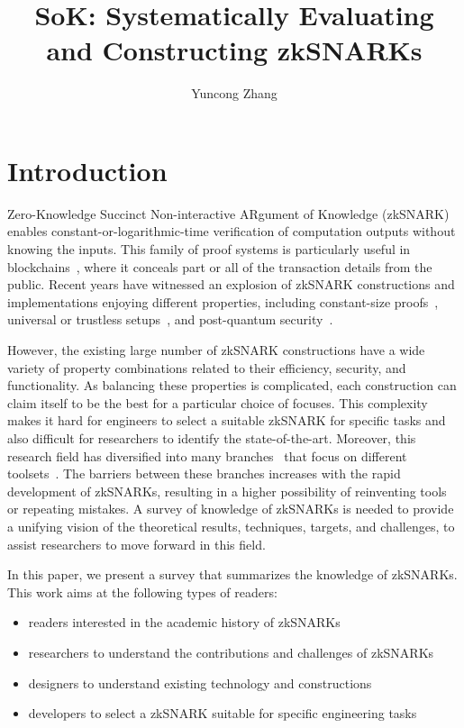 \documentclass[acmtog]{acmart}
\title{SoK: Systematically Evaluating and Constructing zkSNARKs}
\author{Yuncong Zhang}
\begin{document}
\begin{abstract}
\end{abstract}

\maketitle

\section{Introduction}

Zero-Knowledge Succinct Non-interactive ARgument of Knowledge (zkSNARK)~\cite{BitanskyCCT12} enables constant-or-logarithmic-time verification of computation outputs without knowing the inputs.
This family of proof systems is particularly useful in blockchains~\cite{Ben-SassonCG0MTV14, SunALY17}, where it conceals part or all of the transaction details from the public.
Recent years have witnessed an explosion of zkSNARK constructions and implementations enjoying different properties, including constant-size proofs~\cite{Groth16, GennaroGP013, Ben-SassonCGTV13, ParnoHG013, Ben-SassonCTV13}, universal or trustless setups~\cite{GrothKMMM18, MallerBKM19, BunzFS20, Ben-SassonBHR18, Ben-SassonCRSVW19, AmesHIV17}, and post-quantum security~\cite{Ben-SassonBHR18, Ben-SassonCRSVW19}.

However, the existing large number of zkSNARK constructions have a wide variety of property combinations related to their efficiency, security, and functionality.
As balancing these properties is complicated, each construction can claim itself to be the best for a particular choice of focuses.
This complexity makes it hard for engineers to select a suitable zkSNARK for specific tasks and also difficult for researchers to identify the state-of-the-art.
Moreover, this research field has diversified into many branches~\cite{XieZZPS19, Nitulescu19, WalfishB15, AmesHIV17, MallerBKM19} that focus on different toolsets~\cite{KateZG10, BabaiFLS91, BonehF01, FiatS86, GennaroGP013, BunzFS20}.
The barriers between these branches increases with the rapid development of zkSNARKs, resulting in a higher possibility of reinventing tools or repeating mistakes.
A survey of knowledge of zkSNARKs is needed to provide a unifying vision of the theoretical results, techniques, targets, and challenges, to assist researchers to move forward in this field.


In this paper, we present a survey that summarizes the knowledge of zkSNARKs.
This work aims at the following types of readers:
\begin{itemize}
	\item readers interested in the academic history of zkSNARKs
	\item researchers to understand the contributions and challenges of zkSNARKs
	\item designers to understand existing technology and constructions
	\item developers to select a zkSNARK suitable for specific engineering tasks
\end{itemize}
\end{document}
